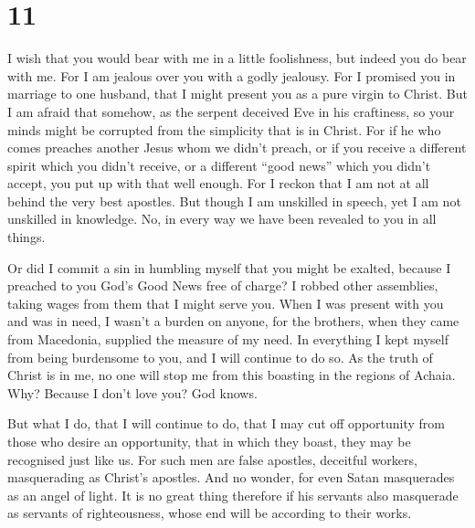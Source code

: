 \hypertarget{section-10}{%
\section{11}\label{section-10}}

 I wish that you would bear with me in a little foolishness,
but indeed you do bear with me.  For I am jealous over you
with a godly jealousy. For I promised you in marriage to one husband,
that I might present you as a pure virgin to Christ.  But I
am afraid that somehow, as the serpent deceived Eve in his craftiness,
so your minds might be corrupted from the simplicity that is in Christ.
 For if he who comes preaches another Jesus whom we didn't
preach, or if you receive a different spirit which you didn't receive,
or a different ``good news'' which you didn't accept, you put up with
that well enough.  For I reckon that I am not at all behind
the very best apostles.  But though I am unskilled in
speech, yet I am not unskilled in knowledge. No, in every way we have
been revealed to you in all things.

 Or did I commit a sin in humbling myself that you might be
exalted, because I preached to you God's Good News free of charge?
 I robbed other assemblies, taking wages from them that I
might serve you.  When I was present with you and was in
need, I wasn't a burden on anyone, for the brothers, when they came from
Macedonia, supplied the measure of my need. In everything I kept myself
from being burdensome to you, and I will continue to do so.
 As the truth of Christ is in me, no one will stop me from
this boasting in the regions of Achaia.  Why? Because I
don't love you? God knows.

 But what I do, that I will continue to do, that I may cut
off opportunity from those who desire an opportunity, that in which they
boast, they may be recognised just like us.  For such men
are false apostles, deceitful workers, masquerading as Christ's
apostles.  And no wonder, for even Satan masquerades as an
angel of light.  It is no great thing therefore if his
servants also masquerade as servants of righteousness, whose end will be
according to their works.

